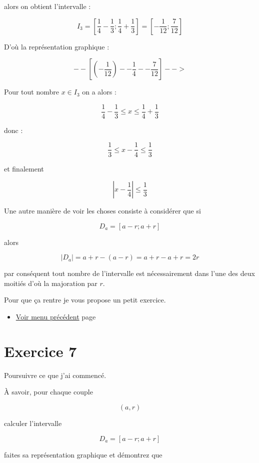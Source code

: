 \documentclass[a4paper,11pt]{book}
\begin{document}
\begin{enumerate}
alors on obtient l'intervalle :

\[I_3 = \left[\dfrac{1}{4} - \dfrac{1}{3} ; \dfrac{1}{4} + \dfrac{1}{3}\right] = \left[-\dfrac{1}{12} ;
   \dfrac{7}{12}\right]\]

D'où la représentation graphique :

\[--\left[\left(-\dfrac{1}{12}\right)--\dfrac{1}{4}--\dfrac{7}{12}\right]-->\]

Pour tout nombre \(x\in I_3\) on a alors :

\[\dfrac{1}{4} - \dfrac{1}{3} \leq x \leq \dfrac{1}{4} +
   \dfrac{1}{3}\]

donc :

\[\dfrac{1}{3}\leq x - \dfrac{1}{4}\leq \dfrac{1}{3}\]

et finalement

\[\left\vert x - \dfrac{1}{4}\right\vert \leq \dfrac{1}{3}\]
\end{enumerate}



Une autre manière de voir les choses consiste à considérer que si

\[D_a = [a - r ; a + r]\]

alors

\[|D_a| = a + r - (a - r) = a + r - a + r = 2r\]

par conséquent tout nombre de l'intervalle est nécessairement dans
l'une des deux moitiés d'où la majoration par \(r\).


Pour que ça rentre je vous propose un petit exercice.

\begin{itemize}
\item \hyperref[orgb78d1c3]{Voir menu précédent}
page~\pageref{page:content4-menu}
\end{itemize}

\clearpage

\section{Exercice 7}
\label{sec:org06a38de}
\label{org69ab718}
\label{page:sec2.4.2exo7}

Poursuivre ce que j'ai commencé.

À savoir, pour chaque couple

\[(a, r)\]

calculer l'intervalle

\[D_a = [a - r ; a + r]\]

faites sa représentation graphique et démontrez que
\end{document}
